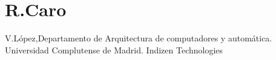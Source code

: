 \chapter{ R.Caro}




 V.López,Departamento de Arquitectura de computadores y automática. Universidad Complutense de Madrid.
Indizen Technologies

%

%
